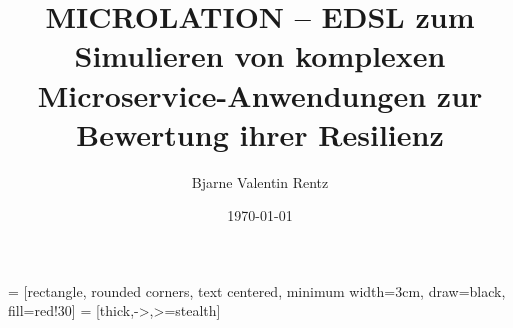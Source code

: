 \documentclass[aspectratio=169]{beamer}
\title{MICROLATION -- EDSL zum Simulieren von komplexen
Microservice-Anwendungen zur Bewertung ihrer Resilienz}
\date{\today}
\author{Bjarne Valentin Rentz}
\institute{NORDAKADEMIE, Hamburg Port Authority}
\begin{document}
  \usetikzlibrary{shapes.geometric, positioning, arrows, calc}

   = [rectangle, rounded corners, text centered, minimum width=3cm, draw=black, fill=red!30]
   = [thick,->,>=stealth]


  \maketitle

  
  
\end{document}
